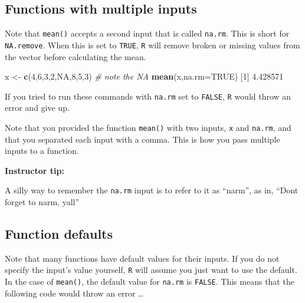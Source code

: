 \documentclass[
]{book}
\newenvironment{Shaded}{\begin{snugshade}}{\end{snugshade}}
\newcommand{\CommentTok}[1]{\textcolor[rgb]{0.56,0.35,0.01}{\textit{#1}}}
\newcommand{\DataTypeTok}[1]{\textcolor[rgb]{0.13,0.29,0.53}{#1}}
\newcommand{\DecValTok}[1]{\textcolor[rgb]{0.00,0.00,0.81}{#1}}
\newcommand{\FloatTok}[1]{\textcolor[rgb]{0.00,0.00,0.81}{#1}}
\newcommand{\KeywordTok}[1]{\textcolor[rgb]{0.13,0.29,0.53}{\textbf{#1}}}
\newcommand{\NormalTok}[1]{#1}
\newcommand{\OtherTok}[1]{\textcolor[rgb]{0.56,0.35,0.01}{#1}}
\newcommand{\StringTok}[1]{\textcolor[rgb]{0.31,0.60,0.02}{#1}}
\begin{document}
\hypertarget{functions-with-multiple-inputs}{%
\subsection*{Functions with multiple inputs}\label{functions-with-multiple-inputs}}

Note that \texttt{mean()} accepts a second input that is called \texttt{na.rm}. This is short for \texttt{NA.remove}. When this is set to \texttt{TRUE}, \texttt{R} will remove broken or missing values from the vector before calculating the mean.

\begin{Shaded}
\begin{Highlighting}[]
\NormalTok{x <-}\StringTok{ }\KeywordTok{c}\NormalTok{(}\DecValTok{4}\NormalTok{,}\DecValTok{6}\NormalTok{,}\DecValTok{3}\NormalTok{,}\DecValTok{2}\NormalTok{,}\OtherTok{NA}\NormalTok{,}\DecValTok{8}\NormalTok{,}\DecValTok{5}\NormalTok{,}\DecValTok{3}\NormalTok{)  }\CommentTok{# note the NA}
\KeywordTok{mean}\NormalTok{(x,}\DataTypeTok{na.rm=}\OtherTok{TRUE}\NormalTok{)}
\NormalTok{[}\DecValTok{1}\NormalTok{] }\FloatTok{4.428571}
\end{Highlighting}
\end{Shaded}

If you tried to run these commands with \texttt{na.rm} set to \texttt{FALSE}, \texttt{R} would throw an error and give up.

Note that you provided the function \texttt{mean()} with two inputs, \texttt{x} and \texttt{na.rm}, and that you separated each input with a comma. This is how you pass multiple inputs to a function.

\leavevmode\hypertarget{tip-text}{}%
\textbf{Instructor tip:}

A silly way to remember the \texttt{na.rm} input is to refer to it as ``narm'', as in, ``Dont forget to narm, yall''

\hypertarget{function-defaults}{%
\subsection*{Function defaults}\label{function-defaults}}

Note that many functions have default values for their inputs. If you do not specify the input's value yourself, \texttt{R} will assume you just want to use the default. In the case of \texttt{mean()}, the default value for \texttt{na.rm} is \texttt{FALSE}. This means that the following code would throw an error \ldots{}
\end{document}
